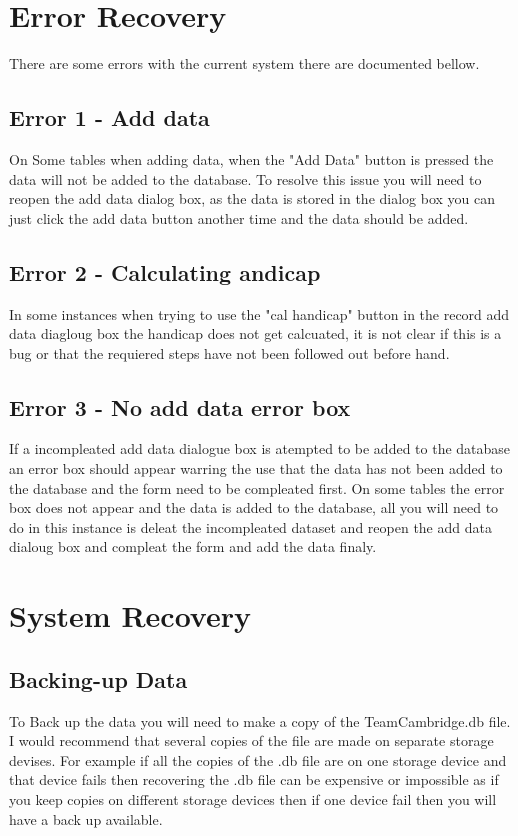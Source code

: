 \section{Error Recovery}
There are some errors with the current system there are documented bellow.

\subsection{Error 1 - Add data}
On Some tables when adding data, when the "Add Data" button is pressed the data will not be added to the database. To resolve this issue you will need to reopen the add data dialog box, as the data is stored in the dialog box you can just click the add data button another time and the data should be added.

\subsection{Error 2 - Calculating andicap}
In some instances when trying to use the "cal handicap" button in the record add data diagloug box the handicap does not get calcuated, it is not clear if this is a bug or that the requiered steps have not been followed out before hand.

\subsection{Error 3 - No add data error box}
If a incompleated add data dialogue box is atempted to be added to the database an error box should appear warring the use that the data has not been added to the database and the form need to be compleated first. On some tables the error box does not appear and the data is added to the database, all you will need to do in this instance is deleat the incompleated dataset and reopen the add data dialoug box and compleat the form and add the data finaly.

\section{System Recovery}

\subsection{Backing-up Data}
To Back up the data you will need to make a copy of the TeamCambridge.db file. I would recommend that several copies of the file are made on separate storage devises. For example if all the copies of the .db file are on one storage device and that device fails then recovering the .db file can be expensive or impossible as if you keep copies on different storage devices then if one device fail then you will have a back up available.

